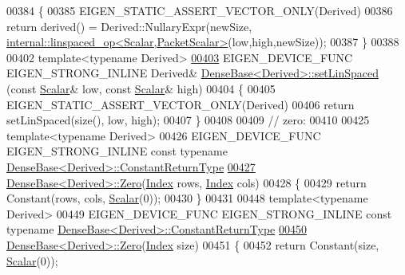 \begin{DoxyCode}
00384 \{
00385   EIGEN\_STATIC\_ASSERT\_VECTOR\_ONLY(Derived)
00386   \textcolor{keywordflow}{return} derived() = Derived::NullaryExpr(newSize, 
      \hyperlink{struct_eigen_1_1internal_1_1linspaced__op}{internal::linspaced\_op<Scalar,PacketScalar>}(low,high,newSize));
00387 \}
00388 
00402 \textcolor{keyword}{template}<\textcolor{keyword}{typename} Derived>
\hyperlink{group___core___module_a99dd31774d69545aba5d4f598cd27c4b}{00403} EIGEN\_DEVICE\_FUNC EIGEN\_STRONG\_INLINE Derived& \hyperlink{group___core___module_a17a69cfd1b44b64f26b1a0f00666a871}{DenseBase<Derived>::setLinSpaced}
      (\textcolor{keyword}{const} \hyperlink{group___core___module_a5feed465b3a8e60c47e73ecce83e39a2}{Scalar}& low, \textcolor{keyword}{const} \hyperlink{group___core___module_a5feed465b3a8e60c47e73ecce83e39a2}{Scalar}& high)
00404 \{
00405   EIGEN\_STATIC\_ASSERT\_VECTOR\_ONLY(Derived)
00406   \textcolor{keywordflow}{return} setLinSpaced(size(), low, high);
00407 \}
00408 
00409 \textcolor{comment}{// zero:}
00410 
00425 \textcolor{keyword}{template}<\textcolor{keyword}{typename} Derived>
00426 EIGEN\_DEVICE\_FUNC EIGEN\_STRONG\_INLINE \textcolor{keyword}{const} \textcolor{keyword}{typename} 
      \hyperlink{group___core___module_class_eigen_1_1_cwise_nullary_op}{DenseBase<Derived>::ConstantReturnType}
\hyperlink{group___core___module_a3832aa9b2ee9ebdb4458003c742c9027}{00427} \hyperlink{group___core___module_a8c4be762b10041d64a2b2ce85bb14ba0}{DenseBase<Derived>::Zero}(\hyperlink{namespace_eigen_a62e77e0933482dafde8fe197d9a2cfde}{Index} rows, \hyperlink{namespace_eigen_a62e77e0933482dafde8fe197d9a2cfde}{Index} cols)
00428 \{
00429   \textcolor{keywordflow}{return} Constant(rows, cols, \hyperlink{group___core___module_a5feed465b3a8e60c47e73ecce83e39a2}{Scalar}(0));
00430 \}
00431 
00448 \textcolor{keyword}{template}<\textcolor{keyword}{typename} Derived>
00449 EIGEN\_DEVICE\_FUNC EIGEN\_STRONG\_INLINE \textcolor{keyword}{const} \textcolor{keyword}{typename} 
      \hyperlink{group___core___module_class_eigen_1_1_cwise_nullary_op}{DenseBase<Derived>::ConstantReturnType}
\hyperlink{group___core___module_a55794ebb0c1cba3b998063a45b18378c}{00450} \hyperlink{group___core___module_a8c4be762b10041d64a2b2ce85bb14ba0}{DenseBase<Derived>::Zero}(\hyperlink{namespace_eigen_a62e77e0933482dafde8fe197d9a2cfde}{Index} size)
00451 \{
00452   \textcolor{keywordflow}{return} Constant(size, \hyperlink{group___core___module_a5feed465b3a8e60c47e73ecce83e39a2}{Scalar}(0));

\end{DoxyCode}
